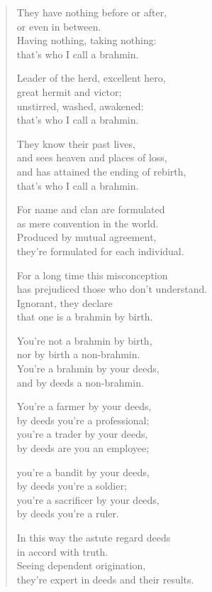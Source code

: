 \documentclass[12pt,openany]{book}%
\begin{document}
\begin{verse}
They have nothing before or after, \\
or even in between. \\
Having nothing, taking nothing: \\
that’s who I call a brahmin. 

Leader of the herd, excellent hero, \\
great hermit and victor; \\
unstirred, washed, awakened: \\
that’s who I call a brahmin. 

They know their past lives, \\
and sees heaven and places of loss, \\
and has attained the ending of rebirth, \\
that’s who I call a brahmin. 

For name and clan are formulated \\
as mere convention in the world. \\
Produced by mutual agreement, \\
they’re formulated for each individual. 

For a long time this misconception \\
has prejudiced those who don’t understand. \\
Ignorant, they declare \\
that one is a brahmin by birth. 

You’re not a brahmin by birth, \\
nor by birth a non-brahmin. \\
You’re a brahmin by your deeds, \\
and by deeds a non-brahmin. 

You’re a farmer by your deeds, \\
by deeds you’re a professional; \\
you’re a trader by your deeds, \\
by deeds are you an employee; 

you’re a bandit by your deeds, \\
by deeds you’re a soldier; \\
you’re a sacrificer by your deeds, \\
by deeds you’re a ruler. 

In this way the astute regard deeds \\
in accord with truth. \\
Seeing dependent origination, \\
they’re expert in deeds and their results. 


\end{verse}
\end{document}
